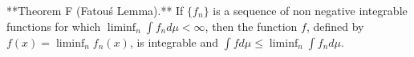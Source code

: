 **Theorem F (Fatou\'s Lemma).** If $\{f_n\}$ is a sequence of non negative integrable functions for which $\liminf_n \int f_n d\mu < \infty$, then the function $f$, defined by $f(x) = \liminf_n f_n(x)$, is integrable and $\int f d\mu \leq \liminf_n \int f_n d\mu$.
